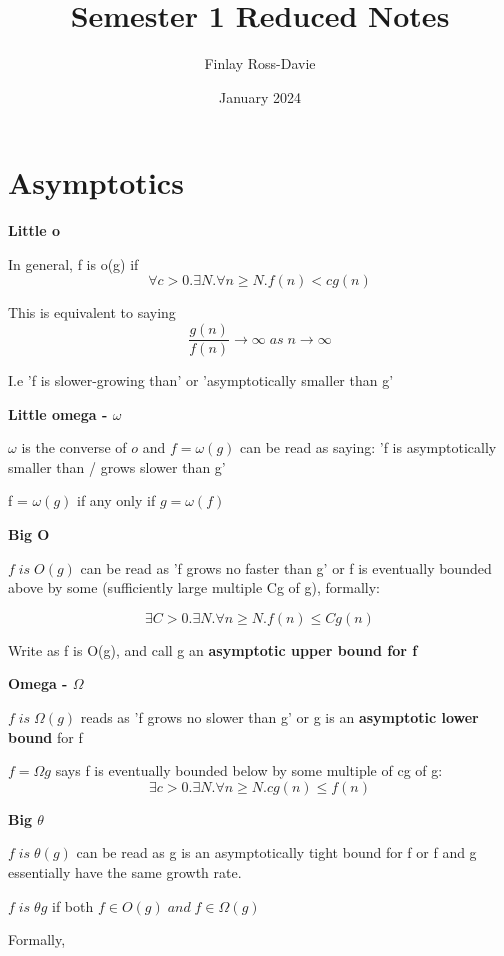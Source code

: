 \documentclass{article}
\title{Semester 1 Reduced Notes}
\author{Finlay Ross-Davie}
\date{January 2024}
\begin{document}
\maketitle

\section{Asymptotics}

\textbf{Little o}

In general, f is o(g) if $$\forall c > 0.\exists N. \forall n \geq N. f(n) < cg(n)$$

This is equivalent to saying $$\frac{g(n)}{f(n)} \rightarrow \infty \; as \; n \rightarrow \infty$$

I.e 'f is slower-growing than' or 'asymptotically smaller than g' \newline

\textbf{Little omega - $\omega$}

$\omega$ is the converse of $o$ and $f = \omega(g)$ can be read as saying: 'f is asymptotically smaller than / grows slower than g'

f = $\omega(g)$ if any only if $g = \omega(f)$ \newline

\textbf{Big O}

$f \; is \; O(g)$ can be read as 'f grows no faster than g' or f is eventually bounded above by some (sufficiently large multiple Cg of g), formally:

$$\exists C >0. \exists N. \forall n \geq N. f(n) \leq Cg(n)$$

Write as f is O(g), and call g an \textbf{asymptotic upper bound for f} \newline

\textbf{Omega - $\Omega$}

$f \; is \; \Omega (g)$ reads as 'f grows no slower than g' or g is an \textbf{asymptotic lower bound} for f 

$f=\Omega g$ says f is eventually bounded below by some multiple of cg of g: 
$$\exists c > 0. \exists N. \forall n \geq N. cg(n) \leq f(n)$$

\textbf{Big $\theta$}

$f \; is \; \theta(g)$ can be read as g is an asymptotically tight bound for f or f and g essentially have the same growth rate. 

$f \; is \; \theta g$ if both $f \in O(g) \; and \; f \in \Omega(g)$

Formally, 
\end{document}
